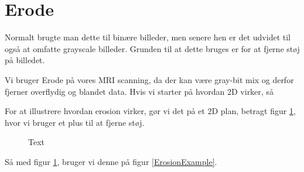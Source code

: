\section{Erode}
Normalt brugte man dette til binære billeder, men senere hen er det udvidet til også at omfatte grayscale billeder. Grunden til at dette bruges er for at fjerne støj på billedet.

Vi bruger Erode på vores MRI scanning, da der kan være gray-bit mix og derfor fjerner overflydig og blandet data. Hvis vi starter på hvordan 2D virker, så

For at illustrere hvordan erosion virker, gør vi det på et 2D plan, betragt figur \ref{Erosion2D}, hvor vi bruger et plus til at fjerne støj.
\begin{figure}[H]
  \centering
  \caption{Text}\label{Erosion2D}
\end{figure}
Så med figur \ref{Erosion2D}, bruger vi denne på figur \ref{ErosionExample}.
